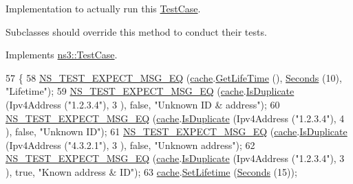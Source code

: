 Implementation to actually run this \hyperlink{classns3_1_1TestCase}{Test\+Case}. 

Subclasses should override this method to conduct their tests. 

Implements \hyperlink{classns3_1_1TestCase_a8ff74680cf017ed42011e4be51917a24}{ns3\+::\+Test\+Case}.


\begin{DoxyCode}
57 \{
58   \hyperlink{group__testing_ga7304ba46a28d8cf08dfdfd6499cf7068}{NS\_TEST\_EXPECT\_MSG\_EQ} (\hyperlink{classns3_1_1aodv_1_1IdCacheTest_a6cccec1766c0093ff16c3abd92f1579c}{cache}.\hyperlink{classns3_1_1aodv_1_1IdCache_a64cdd0f5ea3c40546a0c6002fd1974d9}{GetLifeTime} (), 
      \hyperlink{group__timecivil_ga33c34b816f8ff6628e33d5c8e9713b9e}{Seconds} (10), \textcolor{stringliteral}{"Lifetime"});
59   \hyperlink{group__testing_ga7304ba46a28d8cf08dfdfd6499cf7068}{NS\_TEST\_EXPECT\_MSG\_EQ} (\hyperlink{classns3_1_1aodv_1_1IdCacheTest_a6cccec1766c0093ff16c3abd92f1579c}{cache}.\hyperlink{classns3_1_1aodv_1_1IdCache_a6f32458e4f47ab3d977d8c81742b172c}{IsDuplicate} (Ipv4Address (\textcolor{stringliteral}{"1.2.3.4"}), 3
      ), \textcolor{keyword}{false}, \textcolor{stringliteral}{"Unknown ID & address"});
60   \hyperlink{group__testing_ga7304ba46a28d8cf08dfdfd6499cf7068}{NS\_TEST\_EXPECT\_MSG\_EQ} (\hyperlink{classns3_1_1aodv_1_1IdCacheTest_a6cccec1766c0093ff16c3abd92f1579c}{cache}.\hyperlink{classns3_1_1aodv_1_1IdCache_a6f32458e4f47ab3d977d8c81742b172c}{IsDuplicate} (Ipv4Address (\textcolor{stringliteral}{"1.2.3.4"}), 4
      ), \textcolor{keyword}{false}, \textcolor{stringliteral}{"Unknown ID"});
61   \hyperlink{group__testing_ga7304ba46a28d8cf08dfdfd6499cf7068}{NS\_TEST\_EXPECT\_MSG\_EQ} (\hyperlink{classns3_1_1aodv_1_1IdCacheTest_a6cccec1766c0093ff16c3abd92f1579c}{cache}.\hyperlink{classns3_1_1aodv_1_1IdCache_a6f32458e4f47ab3d977d8c81742b172c}{IsDuplicate} (Ipv4Address (\textcolor{stringliteral}{"4.3.2.1"}), 3
      ), \textcolor{keyword}{false}, \textcolor{stringliteral}{"Unknown address"});
62   \hyperlink{group__testing_ga7304ba46a28d8cf08dfdfd6499cf7068}{NS\_TEST\_EXPECT\_MSG\_EQ} (\hyperlink{classns3_1_1aodv_1_1IdCacheTest_a6cccec1766c0093ff16c3abd92f1579c}{cache}.\hyperlink{classns3_1_1aodv_1_1IdCache_a6f32458e4f47ab3d977d8c81742b172c}{IsDuplicate} (Ipv4Address (\textcolor{stringliteral}{"1.2.3.4"}), 3
      ), \textcolor{keyword}{true}, \textcolor{stringliteral}{"Known address & ID"});
63   \hyperlink{classns3_1_1aodv_1_1IdCacheTest_a6cccec1766c0093ff16c3abd92f1579c}{cache}.\hyperlink{classns3_1_1aodv_1_1IdCache_a39a2377540292d98cfa29b2db6cb7cd9}{SetLifetime} (\hyperlink{group__timecivil_ga33c34b816f8ff6628e33d5c8e9713b9e}{Seconds} (15));

\end{DoxyCode}
